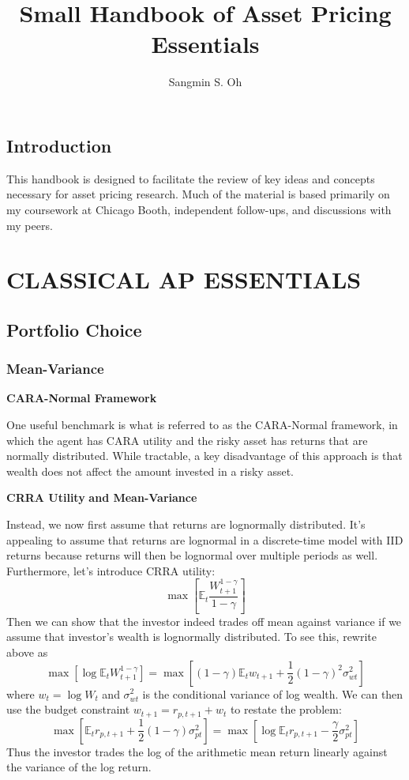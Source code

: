 \documentclass[
]{book}
\title{Small Handbook of Asset Pricing Essentials}
\author{Sangmin S. Oh}
\date{}
\begin{document}
\maketitle

{
\setcounter{tocdepth}{1}
\tableofcontents
}
\hypertarget{introduction}{%
\chapter{Introduction}\label{introduction}}

This handbook is designed to facilitate the review of key ideas and concepts necessary for asset pricing research. Much of the material is based primarily on my coursework at Chicago Booth, independent follow-ups, and discussions with my peers.

\hypertarget{part-classical-ap-essentials}{%
\part*{CLASSICAL AP ESSENTIALS}\label{part-classical-ap-essentials}}

\hypertarget{portfolio-choice}{%
\chapter{Portfolio Choice}\label{portfolio-choice}}

\hypertarget{mean-variance}{%
\section{Mean-Variance}\label{mean-variance}}

\textbf{CARA-Normal Framework}

One useful benchmark is what is referred to as the CARA-Normal framework, in which the agent has CARA utility and the risky asset has returns that are normally distributed. While tractable, a key disadvantage of this approach is that wealth does not affect the amount invested in a risky asset.

\textbf{CRRA Utility} \textbf{and Mean-Variance}

Instead, we now first assume that returns are lognormally distributed. It's appealing to assume that returns are lognormal in a discrete-time model with IID returns because returns will then be lognormal over multiple periods as well. Furthermore, let's introduce CRRA utility:
\[
\max \left[\mathbb{E}_t \frac{W_{t+1}^{1-\gamma}}{1-\gamma}\right]
\]
Then we can show that the investor indeed trades off mean against variance if we assume that investor's wealth is lognormally distributed. To see this, rewrite above as
\[
\max[\log\mathbb{E}_tW_{t+1}^{1-\gamma}] = \max\left[(1-\gamma) \mathbb{E}_tw_{t+1} + \frac{1}{2}(1-\gamma)^2 \sigma_{wt}^2\right]
\]
where \(w_t =\log W_t\) and \(\sigma_{wt}^2\) is the conditional variance of log wealth. We can then use the budget constraint \(w_{t+1} = r_{p,t+1}+w_t\) to restate the problem:
\[
\max \left[\mathbb{E}_t r_{p,t+1} + \frac{1}{2} (1-\gamma) \sigma_{pt}^2\right]=\max\left[\log \mathbb{E}_t r_{p,t+1} - \frac{\gamma}{2} \sigma_{pt}^2\right]
\]
Thus the investor trades the log of the arithmetic mean return linearly against the variance of the log return.
\end{document}
